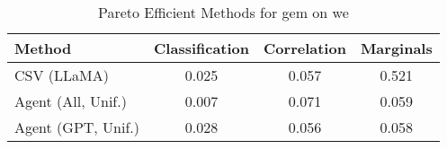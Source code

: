 \begin{table}[t!]
    \centering
    \caption{Pareto Efficient Methods for gem on we}
    \label{tab:pareto_efficient_methods_gem_we}
    \begin{tabular}{lccc}
    \toprule
    Method & Classification & Correlation & Marginals \\
    \midrule
    CSV (LLaMA) & \cellcolor{silver!30}0.025 & \cellcolor{silver!30}0.057 & \cellcolor{bronze!30}0.521 \\
    Agent (All, Unif.) & \cellcolor{gold!30}0.007 & \cellcolor{bronze!30}0.071 & \cellcolor{silver!30}0.059 \\
    Agent (GPT, Unif.) & \cellcolor{bronze!30}0.028 & \cellcolor{gold!30}0.056 & \cellcolor{gold!30}0.058 \\
    \bottomrule
    \end{tabular}
\end{table}